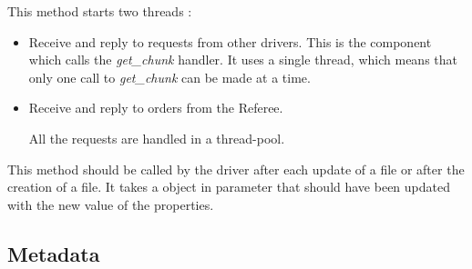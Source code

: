 \documentclass[letterpaper,10pt,english]{sphinxmanual}
\begin{document}
\begin{fulllineitems}
\begin{fulllineitems}
\begin{quote}
\begin{description}
\end{description}\end{quote}

This method starts two threads :
\begin{itemize}
\item {} 

\begin{fulllineitems}
\label{drivers:onitu.api.router.Plug.Router}
Receive and reply to requests from other drivers. This is the
component which calls the \emph{get\_chunk} handler.
It uses a single thread, which means that only one call to
\emph{get\_chunk} can be made at a time.

\end{fulllineitems}


\item {} 

\begin{fulllineitems}
\label{drivers:onitu.api.dealer.Dealer}
Receive and reply to orders from the Referee.

All the requests are handled in a thread-pool.

\end{fulllineitems}


\end{itemize}

\end{fulllineitems}


\begin{fulllineitems}
\label{drivers:onitu.api.Plug.update_file}
This method should be called by the driver after each update
of a file or after the creation of a file.
It takes a {\hyperref[drivers:onitu.api.metadata.Metadata]{}} object in parameter that should have been
updated with the new value of the properties.

\end{fulllineitems}


\end{fulllineitems}



\subsection{Metadata}
\label{drivers:metadata}
\end{document}
